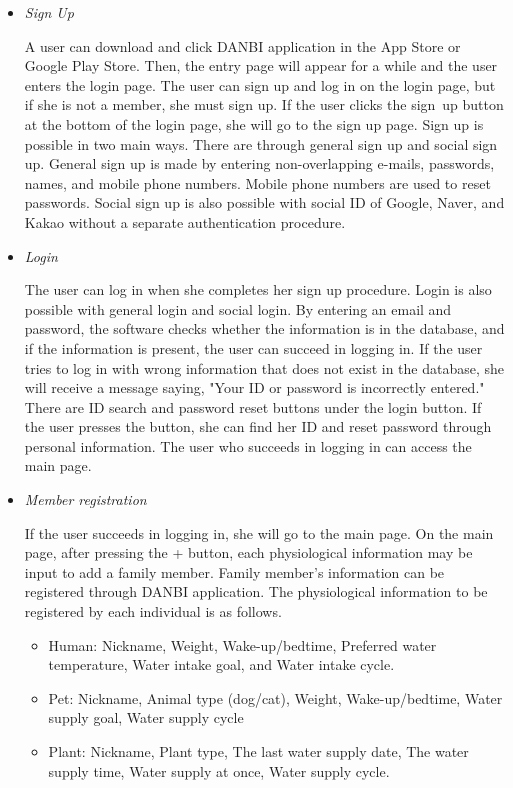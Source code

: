 \documentclass[conference]{IEEEtran}
\begin{document}
\begin{itemize}
\setlength{\parindent}{2ex}
\setlength{\parskip}{0.5em}
\item \textit{Sign Up}

A user can download and click DANBI application in the App Store or Google Play Store. Then, the entry page will appear for a while and the user enters the login page. The user can sign up and log in on the login page, but if she is not a member, she must sign up. If the user clicks the sign up button at the bottom of the login page, she will go to the sign up page. Sign up is possible in two main ways. There are through general sign up and social sign up. General sign up is made by entering non-overlapping e-mails, passwords, names, and mobile phone numbers. Mobile phone numbers are used to reset passwords. Social sign up is also possible with social ID of Google, Naver, and Kakao without a separate authentication procedure.
\item \textit{Login}

The user can log in when she completes her sign up procedure. Login is also possible with general login and social login. By entering an email and password, the software checks whether the information is in the database, and if the information is present, the user can succeed in logging in. If the user tries to log in with wrong information that does not exist in the database, she will receive a message saying, "Your ID or password is incorrectly entered." There are ID search and password reset buttons under the login button. If the user presses the button, she can find her ID and reset password through personal information. The user who succeeds in logging in can access the main page.
\item \textit{Member registration}

If the user succeeds in logging in, she will go to the main page. On the main page, after pressing the + button, each physiological information may be input to add a family member. Family member’s information can be registered through DANBI application. The physiological information to be registered by each individual is as follows.  
\begin{itemize}
    \item Human: Nickname, Weight, Wake-up/bedtime, Preferred water temperature, Water intake goal, and Water intake cycle.  
    \item Pet: Nickname, Animal type (dog/cat), Weight, Wake-up/bedtime, Water supply goal, Water supply cycle   
    \item Plant: Nickname, Plant type, The last water supply date, The water supply time, Water supply at once, Water supply cycle. 
\end{itemize}


\end{itemize}
\end{document}
